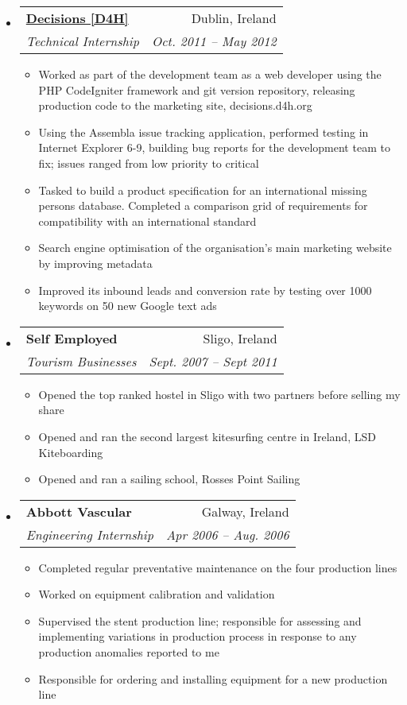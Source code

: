 \documentclass[letterpaper,11pt]{article}
\makeatletter
\newcommand{\resitem}[1]{\item #1 \vspace{-2pt}}
\newcommand{\ressubheading}[4]{
\begin{tabular*}{6.5in}{l@{\extracolsep{\fill}}r}
		\textbf{#1} & #2 \\
		\textit{#3} & \textit{#4} \\
\end{tabular*}\vspace{-6pt}}
\makeatother
\begin{document}
\begin{itemize}
		  \item 
      \ressubheading{\href{http://d4h.org}{Decisions [D4H]}}{Dublin, Ireland}{Technical Internship}{Oct. 2011 -- May 2012}
        { \footnotesize
        \begin{itemize}
      		\resitem{Worked as part of the development team as a web developer using the PHP CodeIgniter framework and git version repository, releasing production code to the marketing site, decisions.d4h.org}
	       	 \resitem{Using the Assembla issue tracking application, performed testing in Internet Explorer 6-9, building bug reports for the development team to fix; issues ranged from low priority to critical}
	   		\resitem{Tasked to build a product specification for an international missing persons database. Completed a comparison grid of requirements for compatibility with an international standard}
	   		\resitem{Search engine optimisation of the organisation’s main marketing website by improving metadata}
	   		\resitem{Improved its inbound leads and conversion rate by testing over 1000 keywords on 50 new Google text ads}
        \end{itemize}
        }
        
		  \item 
      \ressubheading{Self Employed}{Sligo, Ireland}{Tourism Businesses}{Sept. 2007 -- Sept 2011}
        { \footnotesize
        \begin{itemize}
      	 \resitem{Opened the top ranked hostel in Sligo with two partners before selling my share}
        \resitem{Opened and ran the second largest kitesurfing centre in Ireland, LSD Kiteboarding}
        \resitem{Opened and ran a sailing school, Rosses Point Sailing}
        \end{itemize}
        }
        
        	\item 
      \ressubheading{Abbott Vascular}{Galway, Ireland}{Engineering Internship}{Apr 2006 -- Aug. 2006}
      { \footnotesize
      \begin{itemize}
      \resitem{Completed regular preventative maintenance on the four production lines}
      \resitem{Worked on equipment calibration and validation}
      \resitem{Supervised the stent production line; responsible for assessing and implementing variations in production process in response to any production anomalies reported to me}
      \resitem{Responsible for ordering and installing equipment for a new production line}
      \end{itemize}
      }

	\end{itemize}  %
\end{document}
